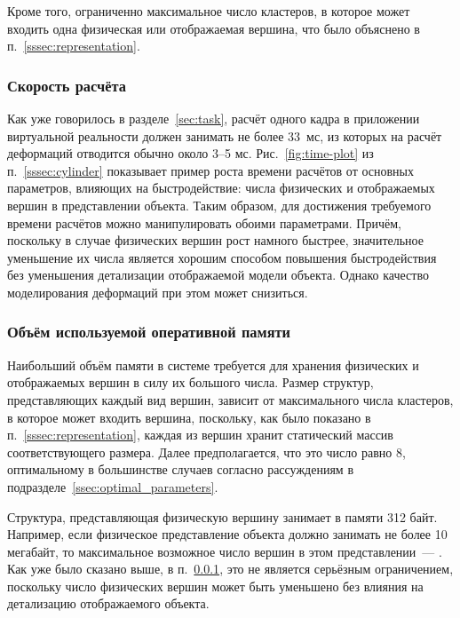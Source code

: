 \documentclass[a4paper, 14pt, titlepage]{extarticle}
\newcommand{\num}[1]{\numprint{#1}}
\begin{document}
      Кроме того, ограниченно максимальное число кластеров, в которое может входить одна физическая
      или отображаемая вершина, что было объяснено в п.~\ref{sssec:representation}.

      \subsubsection{Скорость расчёта}\label{sssec:speed_limit}

        Как уже говорилось в разделе~\ref{sec:task}, расчёт одного кадра в приложении виртуальной реальности должен
        занимать не более 33~мс, из которых на расчёт деформаций отводится обычно около 3--5 мс. Рис.~\ref{fig:time-plot}
        из п.~\ref{sssec:cylinder} показывает пример роста времени расчётов от основных параметров,
        влияющих на быстродействие: числа физических и отображаемых вершин в представлении объекта.
        Таким образом, для достижения требуемого времени расчётов можно манипулировать обоими
        параметрами. Причём, поскольку в случае физических вершин рост намного быстрее, значительное
        уменьшение их числа является хорошим способом повышения быстродействия без уменьшения
        детализации отображаемой модели объекта. Однако качество моделирования деформаций при этом
        может снизиться.

      \subsubsection{Объём используемой оперативной памяти}

        Наибольший объём памяти в системе требуется для хранения физических и отображаемых вершин в
        силу их большого числа. Размер структур, представляющих каждый вид вершин, зависит от
        максимального числа кластеров, в которое может входить вершина, поскольку, как было показано
        в п.~\ref{sssec:representation}, каждая из вершин хранит статический массив соответствующего
        размера. Далее предполагается, что это число равно 8, оптимальному в большинстве случаев
        согласно рассуждениям в подразделе~\ref{ssec:optimal_parameters}.

        Структура, представляющая физическую вершину занимает в памяти 312 байт. Например, если
        физическое представление объекта должно занимать не более 10 мегабайт, то максимальное
        возможное число вершин в этом представлении~--- \num{32051}. Как уже было сказано выше,
        в п.~\ref{sssec:speed_limit}, это не
        является серьёзным ограничением, поскольку число физических вершин может быть уменьшено без
        влияния на детализацию отображаемого объекта.
\end{document}
